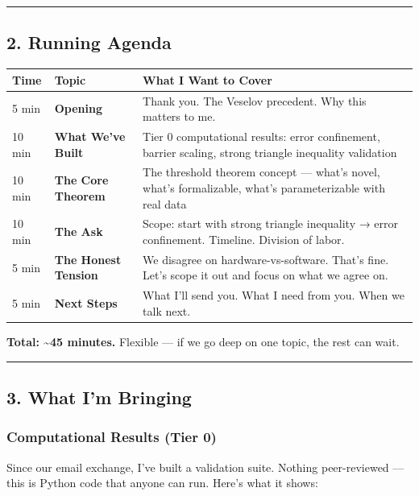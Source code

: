 \documentclass[11pt,a4paper]{article}
\begin{document}
\bigskip
\noindent\rule{\textwidth}{0.4pt}
\bigskip
\subsection*{2. Running Agenda}

\begin{center}
\begin{longtable}{|l|l|l|}
\hline
\textbf{Time} & \textbf{Topic} & \textbf{What I Want to Cover} \\ \hline
\endhead
5 min & \textbf{Opening} & Thank you. The Veselov precedent. Why this matters to me. \\ \hline
10 min & \textbf{What We've Built} & Tier 0 computational results: error confinement, barrier scaling, strong triangle inequality validation \\ \hline
10 min & \textbf{The Core Theorem} & The threshold theorem concept — what's novel, what's formalizable, what's parameterizable with real data \\ \hline
10 min & \textbf{The Ask} & Scope: start with strong triangle inequality → error confinement. Timeline. Division of labor. \\ \hline
5 min & \textbf{The Honest Tension} & We disagree on hardware-vs-software. That's fine. Let's scope it out and focus on what we agree on. \\ \hline
5 min & \textbf{Next Steps} & What I'll send you. What I need from you. When we talk next. \\ \hline
\end{longtable}
\end{center}

\textbf{Total: \textasciitilde{}45 minutes.} Flexible — if we go deep on one topic, the rest can wait.

\bigskip
\noindent\rule{\textwidth}{0.4pt}
\bigskip
\subsection*{3. What I'm Bringing}

\subsubsection*{Computational Results (Tier 0)}

Since our email exchange, I've built a validation suite. Nothing peer-reviewed — this is Python code that anyone can run. Here's what it shows:
\end{document}

